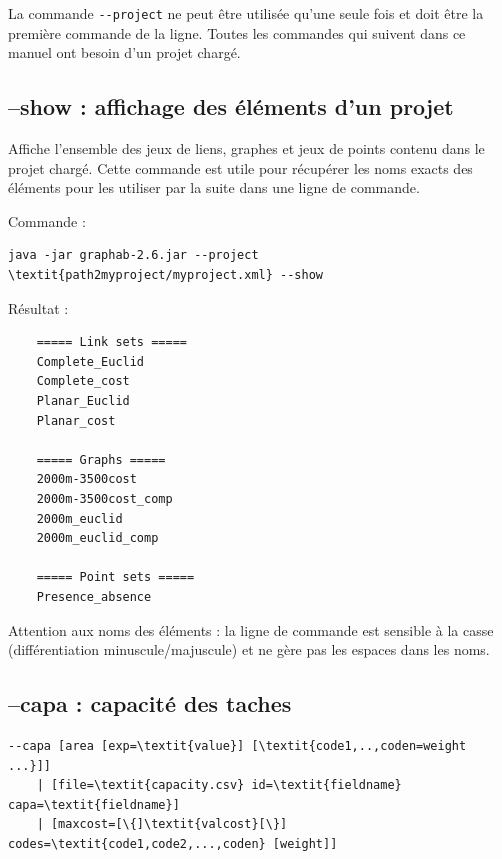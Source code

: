 \documentclass[a4paper,10pt]{report}
\begin{document}
La commande \verb|--project| ne peut être utilisée qu'une seule fois et doit être la première commande de la ligne.
Toutes les commandes qui suivent dans ce manuel ont besoin d'un projet chargé.

\subsection{--show : affichage des éléments d'un projet}
Affiche l'ensemble des jeux de liens, graphes et jeux de points contenu dans le projet chargé.
Cette commande est utile pour récupérer les noms exacts des éléments pour les utiliser par la suite dans une ligne de commande.

Commande :
\begin{Verbatim}[commandchars=\\\{\}]
	java -jar graphab-2.6.jar --project \textit{path2myproject/myproject.xml} --show
\end{Verbatim}
Résultat :
\begin{Verbatim}
	===== Link sets =====
	Complete_Euclid
	Complete_cost
	Planar_Euclid
	Planar_cost
	
	===== Graphs =====
	2000m-3500cost
	2000m-3500cost_comp
	2000m_euclid
	2000m_euclid_comp
	
	===== Point sets =====
	Presence_absence
\end{Verbatim}
Attention aux noms des éléments : la ligne de commande est sensible à la casse (différentiation minuscule/majuscule) et ne gère pas les espaces dans les noms.

\subsection{--capa : capacité des taches}
\begin{Verbatim}[commandchars=\\\{\}]
--capa [area [exp=\textit{value}] [\textit{code1,..,coden=weight ...}]] 
	| [file=\textit{capacity.csv} id=\textit{fieldname} capa=\textit{fieldname}]
	| [maxcost=[\{]\textit{valcost}[\}] codes=\textit{code1,code2,...,coden} [weight]]
\end{Verbatim}
\end{document}
